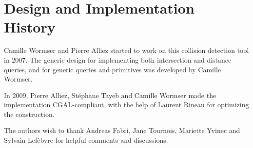 \section{Design and Implementation History}
\label{AABB_tree_section_history}

Camille Wormser and Pierre Alliez started to work on this collision detection tool in 2007. The generic design for implementing both intersection and distance queries, and for generic queries and primitives was developed by Camille Wormser.

In 2009, Pierre Alliez, St\'ephane Tayeb and Camille Wormser made the implementation CGAL-compliant, with the help of Laurent Rineau for optimizing the construction.

The authors wish to thank Andreas Fabri, Jane Tournois, Mariette Yvinec and Sylvain Lef\`ebvre for helpful comments and discussions.
